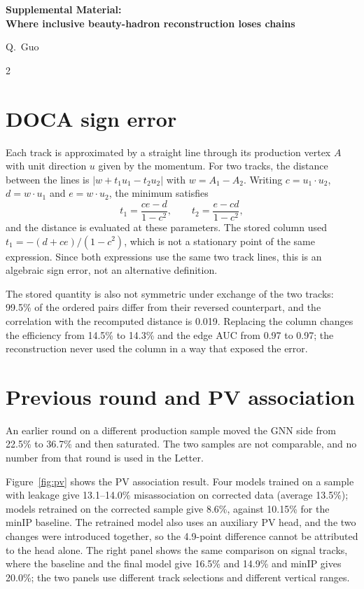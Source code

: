 \documentclass[10pt]{article}
\begin{document}
\begin{center}
{\large\bfseries Supplemental Material:\\[2pt] Where inclusive beauty-hadron reconstruction loses chains\par}
\vspace{0.6em}
{\small Q.~Guo\par}
\end{center}

\vspace{0.4em}
\begin{multicols}{2}

\section{DOCA sign error}

Each track is approximated by a straight line through its production vertex $A$ with unit direction $u$ given by the momentum. For two tracks, the distance between the lines is $|w+t_1u_1-t_2u_2|$ with $w=A_1-A_2$. Writing $c=u_1\cdot u_2$, $d=w\cdot u_1$ and $e=w\cdot u_2$, the minimum satisfies
\begin{equation}
t_1=\frac{ce-d}{1-c^2},\qquad t_2=\frac{e-cd}{1-c^2},
\end{equation}
and the distance is evaluated at these parameters. The stored column used $t_1=-(d+ce)/(1-c^2)$, which is not a stationary point of the same expression. Since both expressions use the same two track lines, this is an algebraic sign error, not an alternative definition.

The stored quantity is also not symmetric under exchange of the two tracks: 99.5\% of the ordered pairs differ from their reversed counterpart, and the correlation with the recomputed distance is 0.019. Replacing the column changes the efficiency from 14.5\% to 14.3\% and the edge AUC from 0.97 to 0.97; the reconstruction never used the column in a way that exposed the error.

\section{Previous round and PV association}

An earlier round on a different production sample moved the GNN side from 22.5\% to 36.7\% and then saturated. The two samples are not comparable, and no number from that round is used in the Letter.

Figure~\ref{fig:pv} shows the PV association result. Four models trained on a sample with leakage give 13.1--14.0\% misassociation on corrected data (average 13.5\%); models retrained on the corrected sample give 8.6\%, against 10.15\% for the minIP baseline. The retrained model also uses an auxiliary PV head, and the two changes were introduced together, so the 4.9-point difference cannot be attributed to the head alone. The right panel shows the same comparison on signal tracks, where the baseline and the final model give 16.5\% and 14.9\% and minIP gives 20.0\%; the two panels use different track selections and different vertical ranges.


\end{multicols}
\end{document}
